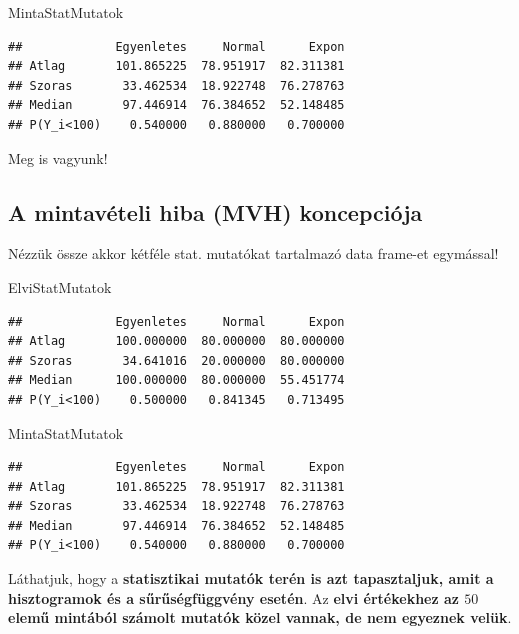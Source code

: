 \documentclass[
]{book}
\newenvironment{Shaded}{\begin{snugshade}}{\end{snugshade}}
\newcommand{\NormalTok}[1]{#1}
\begin{document}
\begin{Shaded}
\begin{Highlighting}[]
\NormalTok{MintaStatMutatok}
\end{Highlighting}
\end{Shaded}

\begin{verbatim}
##             Egyenletes     Normal      Expon
## Atlag       101.865225  78.951917  82.311381
## Szoras       33.462534  18.922748  76.278763
## Median       97.446914  76.384652  52.148485
## P(Y_i<100)    0.540000   0.880000   0.700000
\end{verbatim}

Meg is vagyunk!

\subsection{A mintavételi hiba (MVH) koncepciója}\label{a-mintavuxe9teli-hiba-mvh-koncepciuxf3ja}

Nézzük össze akkor kétféle stat. mutatókat tartalmazó data frame-et egymással!

\begin{Shaded}
\begin{Highlighting}[]
\NormalTok{ElviStatMutatok}
\end{Highlighting}
\end{Shaded}

\begin{verbatim}
##             Egyenletes     Normal      Expon
## Atlag       100.000000  80.000000  80.000000
## Szoras       34.641016  20.000000  80.000000
## Median      100.000000  80.000000  55.451774
## P(Y_i<100)    0.500000   0.841345   0.713495
\end{verbatim}

\begin{Shaded}
\begin{Highlighting}[]
\NormalTok{MintaStatMutatok}
\end{Highlighting}
\end{Shaded}

\begin{verbatim}
##             Egyenletes     Normal      Expon
## Atlag       101.865225  78.951917  82.311381
## Szoras       33.462534  18.922748  76.278763
## Median       97.446914  76.384652  52.148485
## P(Y_i<100)    0.540000   0.880000   0.700000
\end{verbatim}

Láthatjuk, hogy a \textbf{statisztikai mutatók terén is azt tapasztaljuk, amit a hisztogramok és a sűrűségfüggvény esetén}. Az \textbf{elvi értékekhez az \(50\) elemű mintából számolt mutatók közel vannak, de nem egyeznek velük}.
\end{document}
